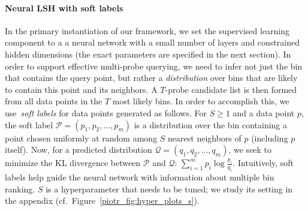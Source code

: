 \documentclass[11pt]{article}
\newcommand{\todoir}[2]{}
\newcommand{\irnote}[1]{\todoir{red}{IR: ``#1''}}
\begin{document}
\paragraph{Neural LSH with soft labels}
In the primary instantiation of our framework, we set the supervised learning component to a a neural network with a small number of layers and constrained hidden dimensions (the exact parameters are specified in the next section).
%
%
%
In order to support effective multi-probe querying, we need to infer not just the bin that contains the query point, but rather a \emph{distribution} over bins that are likely to contain this point and its neighbors.
A $T$-probe candidate list is then formed from all data points in the $T$ most likely bins.
%
In order to accomplish this, we use~\emph{soft labels} for data points generated as follows. For $S \geq 1$ and a data point $p$, the soft label
$\mathcal{P} = (p_1, p_2, \ldots, p_m)$ is a distribution over the bin containing a point chosen uniformly at random among $S$ nearest neighbors of $p$ (including $p$ itself).
Now, for a predicted distribution $\mathcal{Q}=(q_1, q_2,\ldots,q_m)$, we seek to minimize the KL divergence between $\mathcal{P}$ and $\mathcal{Q}$:
$\sum_{i=1}^m p_i \log \frac{p_i}{q_i}$.
Intuitively, soft labels help guide the neural network with information about multiple bin ranking. $S$ is a hyperparameter that needs to be tuned; we study its setting in the appendix (cf.~Figure~\ref{piotr_fig:hyper_plots_s}).

%
\end{document}
